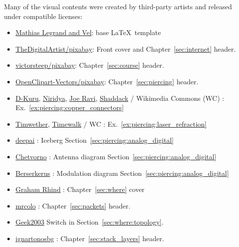 \noindent Many of the visual contents were created by third-party artists and released under compatible licenses:
\begin{itemize}
\item \href{https://www.overleaf.com/latex/templates/the-legrand-orange-book-template-english/jtctyfmnpppc}{Mathias Legrand and Vel}: base \LaTeX\ template
\item \href{https://pixabay.com/users/thedigitalartist-202249/}{TheDigitalArtist/pixabay}: Front cover and Chapter~\ref{sec:internet} header.
\item \href{https://pixabay.com/users/victorsteep-9526460/}{victorsteep/pixabay}: Chapter~\ref{sec:course} header.
\item \href{https://pixabay.com/users/openclipart-vectors-30363/}{OpenClipart-Vectors/pixabay}: Chapter~\ref{sec:piercing} header.
\item 
\href{https://en.wikipedia.org/wiki/File:HDMI_connector-male_2_sharp_PNr\%C2\%B00059.jpg}{D-Kuru},
\href{https://commons.wikimedia.org/wiki/File:USB_Type-C_icon.svg}{Niridya},
\href{https://commons.wikimedia.org/wiki/File:N_Connector.jpg}{Joe Ravi},
\href{https://en.wikipedia.org/wiki/File:Photo-RJ11-MF.jpg}{Shaddack}
/ Wikimedia Commons (WC) : Ex.~\ref{ex:piercing:copper_connectors}
\item \href{https://en.wikipedia.org/wiki/File:Laser_in_fibre.jpg}{Timwether}, \href{https://commons.wikimedia.org/wiki/File:MMF_optical.jpg}{Timewalk} / WC : Ex.~\ref{ex:piercing:laser_refraction}
\item \href{https://deepai.org/machine-learning-model/text2img}{deepai} : Iceberg Section~\ref{sec:piercing:analog_digital}
\item \href{https://commons.wikimedia.org/wiki/File:Dipole_receiving_antenna_animation_6_300ms.gif}{Chetvorno} : Antenna diagram Section~\ref{sec:piercing:analog_digital}
\item \href{https://commons.wikimedia.org/wiki/File:Amfm3-en-de.gif}{Berserkerus} : Modulation diagram Section~\ref{sec:piercing:analog_digital}
\item \href{https://www.pinterest.com/pin/118289927683058369/}{Graham Rhind} : Chapter~\ref{sec:where} cover
\item \href{https://pixabay.com/photos/container-goods-ship-port-cargo-4675851/}{mrcolo} : Chapter~\ref{sec:packets} header.
\item \href{https://commons.wikimedia.org/wiki/File:2550T-PWR-Front.jpg}{Geek2003} Switch in Section~\ref{sec:where:topology}.
\item \href{https://pixabay.com/photos/vegetable-onion-flavor-ingredient-6829271/}{ignartonosbg} : Chapter~\ref{sec:stack_layers} header.

\end{itemize}
